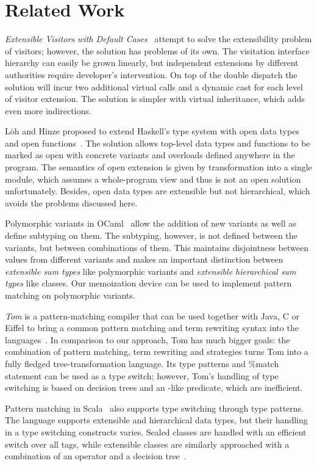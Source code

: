 \section{Related Work} %
\label{sec:rw}

\emph{Extensible Visitors with Default Cases}~\cite[]{Zenger:2001} attempt to solve the extensibility problem of visitors; 
however, the solution has problems of its own. The visitation interface 
hierarchy can easily be grown linearly, but independent extensions by different  
authorities require developer's intervention. On top of the double dispatch the 
solution will incur two additional virtual calls and a dynamic cast for each 
level of visitor extension. The solution is simpler with virtual inheritance, 
which adds even more indirections.

L\"{o}h and Hinze proposed to extend Haskell's type system with open data types 
and open functions~\cite{LohHinze2006}. The solution allows top-level data types 
and functions to be marked as open with concrete variants and overloads defined 
anywhere in the program. The semantics of open extension is given by 
transformation into a single module, which assumes a whole-program view and thus 
is not an open solution unfortunately. Besides, open data types are extensible but not 
hierarchical, which avoids the problems discussed here.

Polymorphic variants in OCaml~\cite{garrigue-98} allow the addition of new 
variants as well as define subtyping on them. The subtyping, however, is not 
defined between the variants, but between combinations of them. 
This maintains disjointness between values from different variants and makes an 
important distinction between \emph{extensible sum types} like polymorphic 
variants and \emph{extensible hierarchical sum types} like classes. Our 
memoization device can be used to implement pattern matching on polymorphic 
variants.

\emph{Tom} is a pattern-matching compiler that can be used together with Java, C or 
Eiffel to bring a common pattern matching and term rewriting syntax into the 
languages~\cite{Moreau:2003}. In comparison to our approach, Tom has much bigger 
goals: the combination of pattern matching, term rewriting and strategies turns 
Tom into a fully fledged tree-transformation language. Its type patterns and \%match 
statement can be used as a type switch; however, Tom's handling of type 
switching is based on decision trees and an -like predicate, 
which are inefficient.

Pattern matching in Scala~\cite{Scala2nd} also supports type switching through 
type patterns. The language supports extensible and hierarchical data types, but
their handling in a type switching constructs varies. Sealed classes are handled 
with an efficient switch over all tags, while extensible classes are similarly 
approached with a combination of an  operator and a decision 
tree~\cite{EmirThesis}.